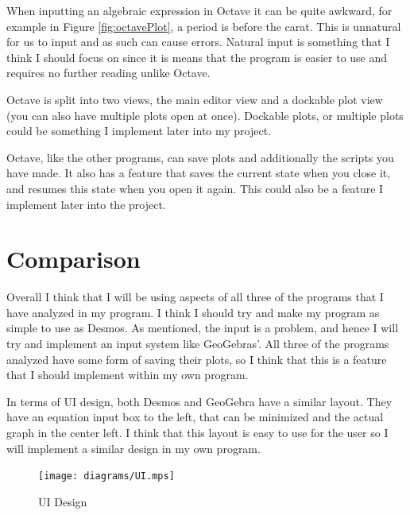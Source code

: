 \documentclass[../../../main.tex]{subfiles}
\begin{document}
When inputting an algebraic expression in Octave it can be quite awkward, for example in Figure \ref{fig:octavePlot}, a period is before the carat. This is unnatural for us to input and as such can cause errors. Natural input is something that I think I should focus on since it is means that the program is easier to use and requires no further reading unlike Octave.

Octave is split into two views, the main editor view and a dockable plot view (you can also have multiple plots open at once). Dockable plots, or multiple plots could be something I implement later into my project.

Octave, like the other programs, can save plots and additionally the scripts you have made. It also has a feature that saves the current state when you close it, and resumes this state when you open it again. This could also be a feature I implement later into the project.

\section{Comparison}
Overall I think that I will be using aspects of all three of the programs that I have analyzed in my program. I think I should try and make my program as simple to use as Desmos. As mentioned, the input is a problem, and hence I will try and implement an input system like GeoGebras'. All three of the programs analyzed have some form of saving their plots, so I think that this is a feature that I should implement within my own program.

In terms of UI design, both Desmos and GeoGebra have a similar layout. They have an equation input box to the left, that can be minimized and the actual graph in the center left. I think that this layout is easy to use for the user so I will implement a similar design in my own program.

\begin{figure}[H]
	\begin{center}
		\texttt{[image: diagrams/UI.mps]}
	\end{center}
	\caption{UI Design}
\end{figure}
\end{document}
